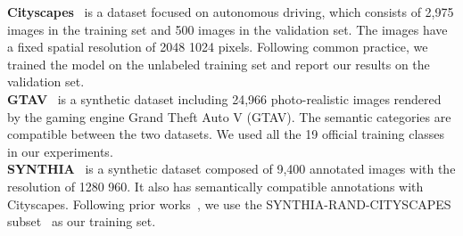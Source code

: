 \documentclass[journal]{IEEEtran}
\begin{document}
{\begin{minipage}{\textwidth}
\noindent \textbf{Cityscapes}~\cite{cordts2016cityscapes} is a dataset focused on autonomous driving,
which consists of 2,975 images in the training set and 500 images in the validation set. The images have
a fixed spatial resolution of 2048  1024 pixels. 
Following common practice, we trained the model on the unlabeled training set and report our results on the validation set.\\
\textbf{GTAV}~\cite{stephan2016gtav} is a synthetic dataset including 24,966 photo-realistic images rendered by the gaming engine Grand Theft Auto V (GTAV).
The semantic categories are compatible between the two datasets. We used all the 19 official training classes in our experiments.\\
\textbf{SYNTHIA}~\cite{ros2016synthia} is a synthetic dataset composed of 9,400
annotated images with the resolution of 1280  960.
It also has semantically compatible annotations with
Cityscapes. Following prior works~\cite{CrossCity,CDA,ROAD},
we use the SYNTHIA-RAND-CITYSCAPES subset~\cite{ros2016synthia} as our training set.


\end{minipage}}
\end{document}
